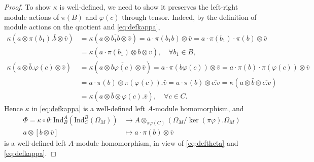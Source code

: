 \documentclass[12pt,a4paper,reqno]{amsart}
\numberwithin{equation}{section}
\numberwithin{equation}{section}
\theoremstyle{definition}
\def \ra {\rightarrow}
\def \ka{\kappa}
\def\Ind{\mathrm{Ind}}
\def\o{\otimes}
\def\Om{\Omega}
\def\Ind{\mathrm{Ind}}
\begin{document}
\begin{proof}
		To show $\ka$ is well-defined, we need to show it preserves the left-right module actions of $\pi(B)$ and $\varphi(c)$ through tensor. Indeed, by the definition of module actions on the quotient and \eqref{eq:defkappa}, 
		\begin{align*}
			\ka(a\o \pi(b_1).\bar{b}\o \bar{v})&=\ka(a\o \overline{b_1b}\o\bar{v})=a\cdot \pi (b_1b)\o \bar{v}=a\cdot \pi(b_1)\cdot \pi(b)\o \bar{v}\\
			&=\ka(a\cdot \pi(b_1)\o \bar{b}\o \bar{v}),\quad \forall b_1\in B,\\
			\ka(a\o\bar{b}.\varphi(c)\o \bar{v})&=\ka(a\o \overline{b\varphi(c)}\o \bar{v})=a\cdot \pi(b\varphi(c))\o\bar{v}=a\cdot \pi(b)\cdot \pi(\varphi(c))\o\bar{v}\\
			&=a\cdot\pi(b)\o \pi(\varphi(c)).\bar{v}=a\cdot \pi(b)\o \overline{c.v}=\ka(a\o\bar{b}\o\overline{c.v})\\
			&=\ka(a\o \bar{b}\o \varphi(c).\bar{v}),\quad \forall c\in C.
		\end{align*}
		Hence $\ka$ in \eqref{eq:defkappa} is a well-defined left $A$-module homomorphism, and 
		\begin{equation}\label{eq:definterphi}
			\begin{aligned}
				\Phi=\ka\circ \theta: \Ind^A_B\left(\Ind^B_C(\Om_M)\right)&\ra A\o_{\pi\varphi(C)}(\Om_M/\ker(\pi\varphi).\Om_M)\\
				a\o [b\o \bar{v}]&\mapsto a\cdot \pi(b)\o \bar{v}
			\end{aligned}
		\end{equation}
		is a well-defined left $A$-module homomorphism, in view of \eqref{eq:deftheta} and \eqref{eq:defkappa}. 
		

\end{proof}
\end{document}
